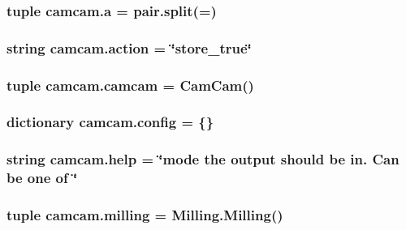 \subsubsection[{a}]{\setlength{\rightskip}{0pt plus 5cm}tuple camcam.\+a = pair.\+split(\textquotesingle{}=\textquotesingle{})}\label{namespacecamcam_a153362c1b392b8de0a98d4b93f10638c}
\hypertarget{namespacecamcam_a0122eec4817954e15d5f9edefce524fc}{}
\subsubsection[{action}]{\setlength{\rightskip}{0pt plus 5cm}string camcam.\+action = \char`\"{}store\+\_\+true\char`\"{}}\label{namespacecamcam_a0122eec4817954e15d5f9edefce524fc}
\hypertarget{namespacecamcam_ae3b479160a02c3c139a79592025c3d1b}{}
\subsubsection[{camcam}]{\setlength{\rightskip}{0pt plus 5cm}tuple camcam.\+camcam = {\bf Cam\+Cam}()}\label{namespacecamcam_ae3b479160a02c3c139a79592025c3d1b}
\hypertarget{namespacecamcam_added01231f61d35e10fa48a4cdeede8a}{}
\subsubsection[{config}]{\setlength{\rightskip}{0pt plus 5cm}dictionary camcam.\+config = \{\}}\label{namespacecamcam_added01231f61d35e10fa48a4cdeede8a}
\hypertarget{namespacecamcam_a351a3f5dcbdb051846c8f8c4c0324f8a}{}
\subsubsection[{help}]{\setlength{\rightskip}{0pt plus 5cm}string camcam.\+help = \char`\"{}mode the output should be in. Can be one of \char`\"{}}\label{namespacecamcam_a351a3f5dcbdb051846c8f8c4c0324f8a}
\hypertarget{namespacecamcam_aa70cd4db1c1fbbbdaa24f25cd8c8a62f}{}
\subsubsection[{milling}]{\setlength{\rightskip}{0pt plus 5cm}tuple camcam.\+milling = {\bf Milling.\+Milling}()}\label{namespacecamcam_aa70cd4db1c1fbbbdaa24f25cd8c8a62f}
\hypertarget{namespacecamcam_a6c00ac1541fda0143382c4edb61b1252}{}
